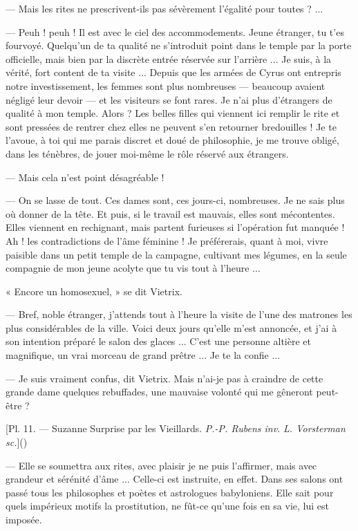 \documentclass[a4paper, 11pt, oneside, polutonikogreek, french]{article}
\begin{document}
--- Mais les rites ne prescrivent-ils pas sévèrement l'égalité pour toutes ? ...

--- Peuh ! peuh ! Il est avec le ciel des accommodements. Jeune étranger, tu t'es fourvoyé. Quelqu'un de ta qualité ne s'introduit point dans le temple par la porte officielle, mais bien par la discrète entrée réservée sur l'arrière ... Je suis, à la vérité, fort content de ta visite ... Depuis que les armées de Cyrus ont entrepris notre investissement, les femmes sont plus nombreuses --- beaucoup avaient négligé leur devoir --- et les visiteurs se font rares. Je n'ai plus d'étrangers de qualité à mon temple. Alors ? Les belles filles qui viennent ici remplir le rite et sont pressées de rentrer chez elles ne peuvent s'en retourner bredouilles ! Je te l'avoue, à toi qui me parais discret et doué de philosophie, je me trouve obligé, dans les ténèbres, de jouer moi-même le rôle réservé aux étrangers.

--- Mais cela n'est point désagréable !

--- On se lasse de tout. Ces dames sont, ces jours-ci, nombreuses. Je ne sais plus où donner de la tête. Et puis, si le travail est mauvais, elles sont mécontentes. Elles viennent en rechignant, mais partent furieuses si l'opération fut manquée ! Ah ! les contradictions de l'âme féminine ! Je préférerais, quant à moi, vivre paisible dans un petit temple de la campagne, cultivant mes légumes, en la seule compagnie de mon jeune acolyte que tu vis tout à l'heure ...

« Encore un homosexuel, » se dit Vietrix.

--- Bref, noble étranger, j'attends tout à l'heure la visite de l'une des matrones les plus considérables de la ville. Voici deux jours qu'elle m'est annoncée, et j'ai à son intention préparé le salon des glaces ... C'est une personne altière et magnifique, un vrai morceau de grand prêtre ... Je te la confie ...

--- Je suis vraiment confus, dit Vietrix. Mais n'ai-je pas à craindre de cette grande dame quelques rebuffades, une mauvaise volonté qui me gêneront peut-être ?

[Pl. 11. --- Suzanne Surprise par les Vieillards. \emph{P.-P. Rubens inv.} \emph{L. Vorsterman sc.}]()

--- Elle se soumettra aux rites, avec plaisir je ne puis l'affirmer, mais avec grandeur et sérénité d'âme ... Celle-ci est instruite, en effet. Dans ses salons ont passé tous les philosophes et poètes et astrologues babyloniens. Elle sait pour quels impérieux motifs la prostitution, ne fût-ce qu'une fois en sa vie, lui est imposée.
\end{document}

